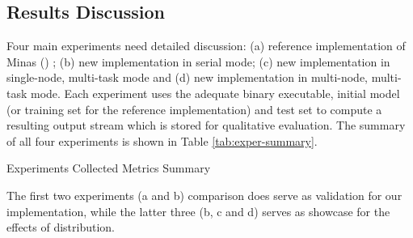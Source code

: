 \documentclass[conference]{IEEEtran}
\begin{document}

\subsection{Results Discussion}

Four main experiments need detailed discussion:
(a) reference implementation of Minas () \cite{Faria2016minas};
(b) new implementation in serial mode;
(c) new implementation in single-node, multi-task mode and
(d) new implementation in multi-node, multi-task mode.
Each experiment uses the adequate binary executable, initial model
(or training set for the reference implementation) and test set
to compute a resulting output stream which is stored for qualitative evaluation.
The summary of all four experiments is shown in Table \ref{tab:exper-summary}.

\begin{table}[h]\begin{center}
  \caption{Experiments Collected Metrics Summary}
  
  \label{tab:exper-summary}
\end{center}\end{table}

The first two experiments (a and b) comparison does serve as validation for our
implementation, while the latter three (b, c and d) serves as showcase for
the effects of distribution.
\end{document}
